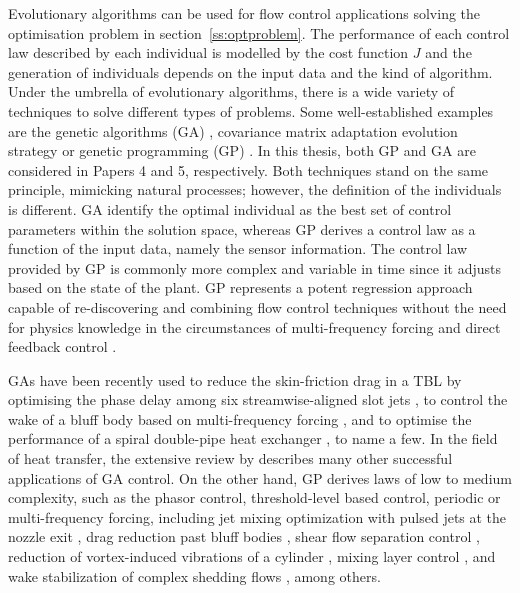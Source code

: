 Evolutionary algorithms can be used for flow control applications solving the optimisation problem in section~\ref{ss:optproblem}. The performance of each control law described by each individual is modelled by the cost function $J$ and the generation of individuals depends on the input data and the kind of algorithm. Under the umbrella of evolutionary algorithms, there is a wide variety of techniques to solve different types of problems. Some well-established examples are the genetic algorithms (GA) \citep{holland1992adaptation}, covariance matrix adaptation evolution strategy \citep{Hansen1996cmaes} or genetic programming (GP) \citep{Koza1994gp}. In this thesis, both GP and GA are considered in Papers 4 and 5, respectively. Both techniques stand on the same principle, mimicking natural processes; however, the definition of the individuals is different. GA identify the optimal individual as the best set of control parameters within the solution space, whereas GP derives a control law as a function of the input data, namely the sensor information. The control law provided by GP is commonly more complex and variable in time since it adjusts based on the state of the plant. GP represents a potent regression approach capable of re-discovering and combining flow control techniques without the need for physics knowledge in the circumstances of multi-frequency forcing and direct feedback control \citep{cornejomaceda2019pamm}.

GAs have been recently used to reduce the skin-friction drag in a TBL by optimising the phase delay among six streamwise-aligned slot jets \citep{Yu2021GA_drag_slot_jets},  to control the wake of a bluff body based on multi-frequency forcing \citep{minelli2020lgac}, and to optimise the performance of a spiral double-pipe heat exchanger \citep{Tian2020GAheatexchanger}, to name a few. In the field of heat transfer, the extensive review by \citet{Gosselin2009GareviewHT} describes many other successful applications of GA control. On the other hand, GP derives laws of low to medium complexity, such as the phasor control, threshold-level based control, periodic or multi-frequency forcing, including jet mixing optimization with pulsed jets at the nozzle exit \citep{zhou2020artificial}, drag reduction past bluff bodies \citep{li2019prf}, shear flow separation control \citep{gautier2015MLC}, reduction of vortex-induced vibrations of a cylinder \citep{Ren2019pof}, mixing layer control \citep{Parezanovic2016jfm}, and wake stabilization of complex shedding flows \citep{raibaudo2019pof}, among others.\\

